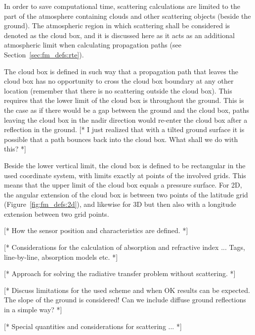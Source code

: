 \label{sec:fm_defs:cloudbox}

In order to save computational time, scattering calculations are
limited to the part of the atmosphere containing clouds and other
scattering objects (beside the ground). The atmospheric region in
which scattering shall be considered is denoted as the cloud box, and
it is discussed here as it acts as an additional atmospheric limit
when calculating propagation paths (see Section~\ref{sec:fm_defs:rte}). 

The cloud box is defined in such way that a propagation path that
leaves the cloud box has no opportunity to cross the cloud box
boundary at any other location (remember that there is no scattering
outside the cloud box). This requires that the lower limit of the
cloud box is throughout the ground. This is the case as if there would
be a gap between the ground and the cloud box, paths leaving the cloud
box in the nadir direction would re-enter the cloud box after a
reflection in the ground. [* I just realized that with a tilted ground
surface it is possible that a path bounces back into the cloud box.
What shall we do with this? *]

Beside the lower vertical limit, the cloud box is defined to be
rectangular in the used coordinate system, with limits exactly at
points of the involved grids. This means that the upper limit of the
cloud box equals a pressure surface. For 2D, the angular extension of
the cloud box is between two points of the latitude grid
(Figure~\ref{fig:fm_defs:2d}), and likewise for 3D but then also with
a longitude extension between two grid points.



\label{sec:fm_defs:sensor}

[* How the sensor position and characteristics are defined. *]



\label{sec:fm_defs:absorption}

[* Considerations for the calculation of absorption and refractive index ...
Tags, line-by-line, absorption models etc. *]



\label{sec:fm_defs:rte}

[* Approach for solving the radiative transfer problem without scattering. *]

\label{sec:fm_defs:groundrefl}

[* Discuss limitations for the used scheme and when OK results can be
expected. The slope of the ground is considered! Can we include
diffuse ground reflections in a simple way? *]


\label{sec:fm_defs:scattering}

[* Special quantities and considerations for scattering ... *]


